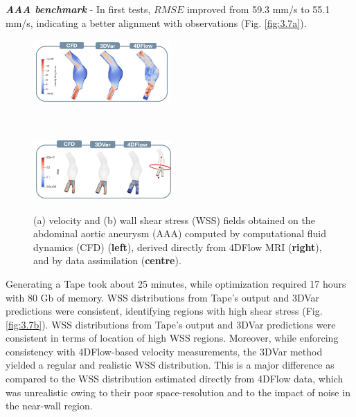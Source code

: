 \textbf{\textit{AAA benchmark}} - In first tests, \(RMSE\) improved from 59.3 mm/s to 55.1 mm/s, indicating a better alignment with observations (Fig. \ref{fig:3.7a}). 
\begin{figure}
    \centering
    \begin{minipage}{\textwidth}
        \centering
        \includegraphics[width=0.47\textwidth, height = 0.15\textheight]{chapters/chp1/graphics/RealData3DVar.JPG}
        \label{fig:3.7a}
    \end{minipage}
    \\[1em]  %
    \begin{minipage}{\textwidth}
        \centering
        \includegraphics[width=0.47\textwidth, height = 0.15\textheight]{chapters/chp1/graphics/WSS3DVar.JPG}
        \label{fig:3.7b}
    \end{minipage}
    \caption{\small (a) velocity and (b) wall shear stress (WSS) fields obtained on the abdominal aortic aneurysm (AAA) computed by computational fluid dynamics (CFD) (\textbf{left}), derived directly from 4DFlow MRI (\textbf{right}), and by  data assimilation (\textbf{centre}).}
    \label{fig:3.7}
\end{figure}
Generating a Tape took about 25 minutes, while optimization required 17 hours with 80 Gb of memory. WSS distributions from Tape's output and 3DVar predictions were consistent, identifying regions with high shear stress (Fig. \ref{fig:3.7b}). WSS distributions from Tape's output and 3DVar predictions were consistent in terms of location of high WSS regions. Moreover, while enforcing consistency with 4DFlow-based velocity measurements, the 3DVar method yielded a regular and realistic WSS distribution. This is a major difference as compared to the WSS distribution estimated directly from 4DFlow data, which was unrealistic owing to their poor space-resolution and to the impact of noise in the near-wall region.


